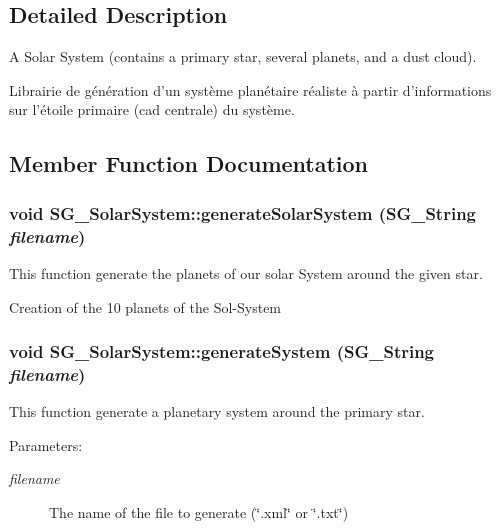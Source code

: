 \subsection{Detailed Description}
A Solar System (contains a primary star, several planets, and a dust cloud). 

Librairie de g\'{e}n\'{e}ration d'un syst\`{e}me plan\'{e}taire r\'{e}aliste \`{a} partir d'informations sur l'\'{e}toile primaire (cad centrale) du syst\`{e}me. 



\subsection{Member Function Documentation}
\subsubsection{\setlength{\rightskip}{0pt plus 5cm}void SG\_\-Solar\-System::generate\-Solar\-System (SG\_\-String {\em filename})}\label{class_s_g___solar_system_a4}


This function generate the planets of our solar System around the given star. 

Creation of the 10 planets of the Sol-System 
\subsubsection{\setlength{\rightskip}{0pt plus 5cm}void SG\_\-Solar\-System::generate\-System (SG\_\-String {\em filename})}\label{class_s_g___solar_system_a3}


This function generate a planetary system around the primary star. 

\begin{Desc}
\item[Parameters:]
\begin{description}
\item[{\em filename}]The name of the file to generate (\char`\"{}.xml\char`\"{} or \char`\"{}.txt\char`\"{}) \end{description}
\end{Desc}
